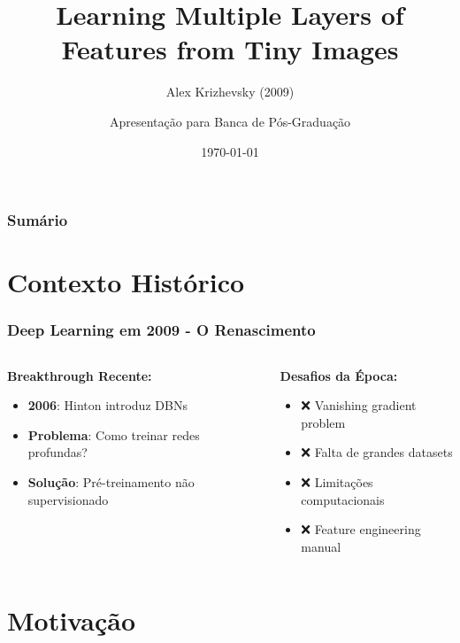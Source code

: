 \documentclass[aspectratio=169]{beamer}
\title{Learning Multiple Layers of Features from Tiny Images}
\subtitle{Alex Krizhevsky (2009)}
\author{Apresentação para Banca de Pós-Graduação}
\institute{University of Toronto \\ Orientador: Geoffrey Hinton}
\date{\today}
\begin{document}
\begin{frame}
\titlepage
\end{frame}

\begin{frame}
\frametitle{Sumário}
\tableofcontents
\end{frame}

\section{Contexto Histórico}

\begin{frame}
\frametitle{Deep Learning em 2009 - O Renascimento}
\begin{columns}
\begin{column}{0.5\textwidth}
\textbf{Breakthrough Recente:}
\begin{itemize}
    \item \textcolor{azulescuro}{\textbf{2006}}: Hinton introduz DBNs
    \item \textcolor{azulescuro}{\textbf{Problema}}: Como treinar redes profundas?
    \item \textcolor{azulescuro}{\textbf{Solução}}: Pré-treinamento não supervisionado
\end{itemize}
\end{column}
\begin{column}{0.5\textwidth}
\textbf{Desafios da Época:}
\begin{itemize}
    \item ❌ Vanishing gradient problem
    \item ❌ Falta de grandes datasets
    \item ❌ Limitações computacionais
    \item ❌ Feature engineering manual
\end{itemize}
\end{column}
\end{columns}
\end{frame}

\section{Motivação}
\end{document}
